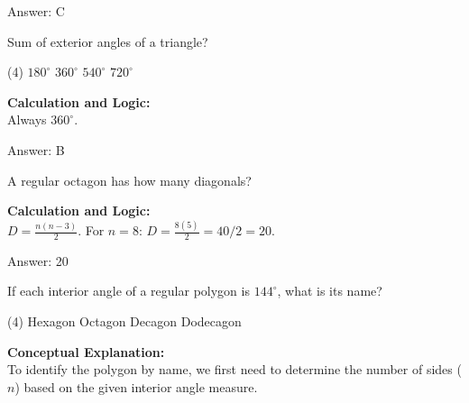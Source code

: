 \documentclass[11pt,paper=a4,answers]{exam}
\begin{document}
\begin{questions}
\begin{solution}
\vspace{30pt}

Answer: \colorbox{yellow!100}{C}
\end{solution}

\vspace{60pt}

\question
Sum of exterior angles of a triangle?
\begin{tasks}(4)
    \task $180^\circ$
    \task $360^\circ$
    \task $540^\circ$
    \task $720^\circ$
\end{tasks}

\begin{solution}
\textbf{Calculation and Logic:} \\
Always $360^\circ$.

\vspace{30pt}

Answer: \colorbox{yellow!100}{B}
\end{solution}

\vspace{60pt}

\question
A regular octagon has how many diagonals?

\begin{solution}
\textbf{Calculation and Logic:} \\
$D = \frac{n(n - 3)}{2}$. For $n = 8$: $D = \frac{8(5)}{2} = 40 / 2 = 20$.

\vspace{30pt}

Answer: \colorbox{yellow!100}{20}
\end{solution}

\vspace{60pt}

\question
If each interior angle of a regular polygon is $144^\circ$, what is its name?
\begin{tasks}(4)
    \task Hexagon
    \task Octagon
    \task Decagon
    \task Dodecagon
\end{tasks}

\begin{solution}
\textbf{Conceptual Explanation:} \\
To identify the polygon by name, we first need to determine the number of sides ($n$) based on the given interior angle measure.


\end{solution}
\end{questions}
\end{document}
